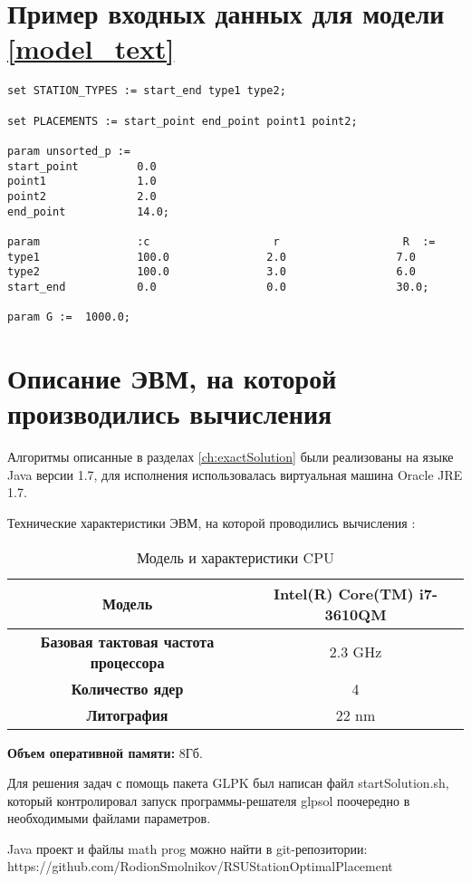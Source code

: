 \section{Пример входных данных для модели \ref{model_text}}
\begin{verbatim}
set STATION_TYPES := start_end type1 type2;

set PLACEMENTS := start_point end_point point1 point2;

param unsorted_p := 
start_point         0.0
point1              1.0
point2              2.0
end_point           14.0;

param               :c                   r                   R  :=
type1               100.0               2.0                 7.0                 
type2               100.0               3.0                 6.0                 
start_end           0.0                 0.0                 30.0;  

param G :=  1000.0;
\end{verbatim}

\section{Описание ЭВМ, на которой производились вычисления} \label{tech}
Алгоритмы описанные в разделах \ref{ch:exactSolution} были реализованы на языке Java версии 1.7, для исполнения использовалась виртуальная машина Oracle JRE 1.7.

Технические характеристики ЭВМ, на которой проводились вычисления \cite{intelUrl}:

\begin{table}[H]
	\caption{Модель и характеристики CPU}
	\begin{center}
		\begin{tabular}{|c|c|}
			\hline
			\textbf{Модель} & Intel(R) Core(TM) i7-3610QM \\
			\hline
			\textbf{Базовая тактовая частота процессора} & 2.3 GHz \\
			\hline
			\textbf{Количество ядер} & 4 \\
			\hline
			\textbf{Литография} & 22 nm\\
			\hline
		\end{tabular}
	\end{center}
\end{table} 

\textbf{Объем оперативной памяти:} 8Гб.

Для решения задач с помощь пакета GLPK был написан файл startSolution.sh, который контролировал запуск программы-решателя glpsol поочередно в необходимыми файлами параметров.

Java проект и файлы math prog можно найти в git-репозитории:
https://github.com/RodionSmolnikov/RSUStationOptimalPlacement

